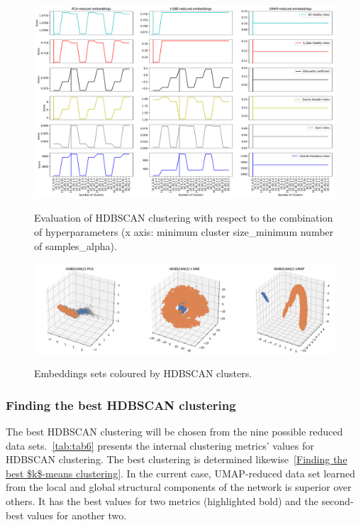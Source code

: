 \begin{figure}[!ht]
	\centering
	\includegraphics[width=1.0\textwidth]{images/evaluations/Fig41.pdf}\\
	\caption{Evaluation of HDBSCAN clustering with respect to the combination of hyperparameters (x axis: minimum cluster size\_minimum number of samples\_alpha).}
	\label{fig:Fig41}
\end{figure}
\begin{figure}[!ht]
	\centering
	\includegraphics[width=1.0\textwidth]{images/evaluations/Fig42.pdf}\\
	\caption{Embeddings sets coloured by HDBSCAN clusters.}
	\label{fig:Fig42}
\end{figure}

\subsubsection{Finding the best HDBSCAN clustering}
The best HDBSCAN clustering will be chosen from the nine possible reduced data sets.~\autoref{tab:tab6} presents the internal clustering metrics' values for HDBSCAN clustering. The best clustering is determined likewise~\ref{Finding the best $k$-means clustering}. In the current case, UMAP-reduced data set learned from the local and global structural components of the network is superior over others. It has the best values for two metrics (highlighted bold) and the second-best values for another two.

